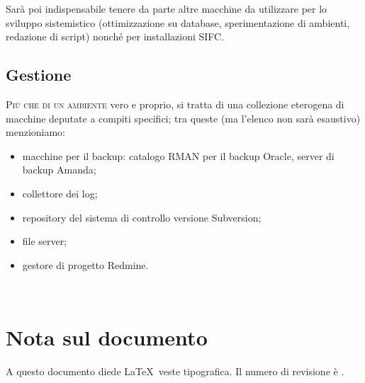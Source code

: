 \documentclass[headinclude,footinclude,a4paper,11pt,final]{scrreprt}
\begin{document}
Sarà poi indispensabile tenere da parte altre macchine da utilizzare per lo sviluppo sistemistico (ottimizzazione su database, sperimentazione di ambienti, redazione di script) nonché per installazioni SIFC.

\section{Gestione}

\lettrine{P}{iù che di un ambiente} vero e proprio, si tratta di una collezione eterogena di macchine deputate a compiti specifici;  tra queste (ma l'elenco non sarà esaustivo) menzioniamo:
\begin{itemize}
\item macchine per il backup: catalogo RMAN per il backup Oracle, server di backup Amanda;
\item collettore dei log;
\item repository del sistema di controllo versione Subversion;
\item file server;
\item gestore di progetto Redmine.
\end{itemize}



\clearpage
{}

\begingroup
\let\clearpage\relax
~
\vfill
\vfill

\chapter*{Nota sul documento}

A questo documento diede \LaTeX\ veste tipografica.  Il numero di revisione è \RCSRevision.

\endgroup
\vfill
\thispagestyle{empty}
\end{document}
